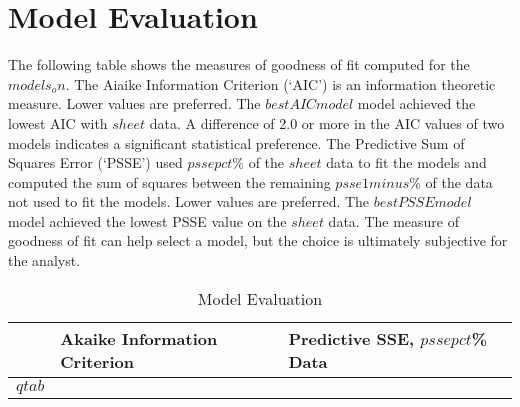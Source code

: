 \documentclass{article}
\begin{document}
\newpage


\section{Model Evaluation}
The following table shows the measures of goodness of fit computed for the $models_on$. The Aiaike Information Criterion (`AIC') is an information theoretic measure. Lower values are preferred. The $bestAICmodel$ model achieved the lowest AIC with $sheet$ data. A difference of 2.0 or more in the AIC values of two models indicates a significant statistical preference. The Predictive Sum of Squares Error (`PSSE') used $pssepct$\% of the $sheet$ data to fit the models and computed the sum of squares between the remaining $psse1minus$\% of the data not used to fit the models. Lower values are preferred. The $bestPSSEmodel$ model achieved the lowest PSSE value on the $sheet$ data. The measure of goodness of fit can help select a model, but the choice is ultimately subjective for the analyst.

\begin{table}[h!]
\centering
\caption{Model Evaluation}
\begin{tabular}{lll}
\hline
 &  Akaike Information Criterion & Predictive SSE, $pssepct$\% Data \\ \hline
$qtab$
\hline
\end{tabular}
\end{table}
\end{document}
